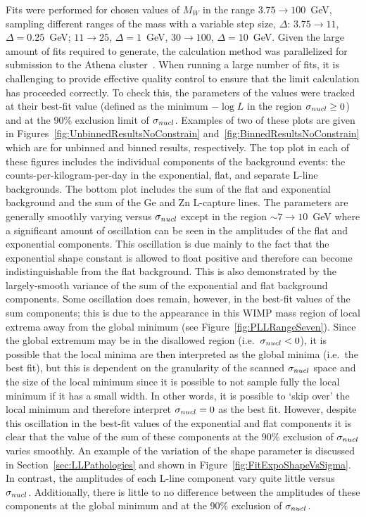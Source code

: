 Fits were performed for chosen values of $M_{W}$ in the range $3.75\to100$~GeV, sampling different ranges of the mass with a variable step size, $\Delta$: $3.75\to11$, $\Delta=0.25$~GeV; $11\to25$, $\Delta=1$~GeV, $30\to100$, $\Delta=10$~GeV.  Given the large amount of fits required to generate, the calculation method was parallelized for submission to the Athena cluster~\cite{Athena}.  When running a large number of fits, it is challenging to provide effective quality control to ensure that the limit calculation has proceeded correctly.  To check this, the parameters of the values were tracked at their best-fit value (defined as the minimum $-\log L$ in the region $\sigma_{nucl}\geq0$) and at the 90\% exclusion limit of $\sigma_{nucl}$.  Examples of two of these plots are given in Figures~\ref{fig:UnbinnedResultsNoConstrain} and~\ref{fig:BinnedResultsNoConstrain} which are for unbinned and binned results, respectively.  The top plot in each of these figures includes the individual components of the background events: the counts-per-kilogram-per-day in the exponential, flat, and separate L-line backgrounds.  The bottom plot includes the sum of the flat and exponential background and the sum of the Ge and Zn L-capture lines.  The parameters are generally smoothly varying versus $\sigma_{nucl}$ except in the region $\sim7\to10$~GeV where a significant amount of oscillation can be seen in the amplitudes of the flat and exponential components.  This oscillation is due mainly to the fact that the exponential shape constant is allowed to float positive and therefore can become indistinguishable from the flat background.  This is also demonstrated by the largely-smooth variance of the sum of the exponential and flat background components.  Some oscillation does remain, however, in the best-fit values of the sum components; this is due to the appearance in this WIMP mass region of local extrema away from the global minimum (see Figure~\ref{fig:PLLRangeSeven}).  Since the global extremum may be in the disallowed region (i.e.~$\sigma_{nucl}<0$), it is possible that the local minima are then interpreted as the global minima (i.e.~the best fit), but this is dependent on the granularity of the scanned $\sigma_{nucl}$ space and the size of the local minimum since it is possible to not sample fully the local minimum if it has a small width.  In other words, it is possible to `skip over' the local minimum and therefore interpret $\sigma_{nucl}=0$ as the best fit.  However, despite this oscillation in the best-fit values of the exponential and flat components it is clear that the value of the sum of these components at the 90\% exclusion of $\sigma_{nucl}$ varies smoothly.  An example of the variation of the shape parameter is discussed in Section~\ref{sec:LLPathologies} and shown in Figure~\ref{fig:FitExpoShapeVsSigma}.  In contrast, the amplitudes of each L-line component vary quite little versus $\sigma_{nucl}$.  Additionally, there is little to no difference between the amplitudes of these components at the global minimum and at the 90\% exclusion of $\sigma_{nucl}$.  

